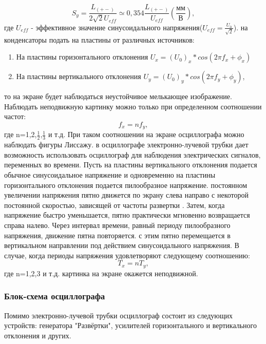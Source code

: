 \begin{equation}
\label{eq:2}
    S_{y}=\frac{L_{(+-)}}{2\sqrt{2}U_{eff} } \simeq 0,354\frac{L_{(+-)}}{U_{eff} }(\frac{\text{мм}}{\text{В}}),
\end{equation}
где $U_{eff}$ - эффективное значение синусоидального напряжения($U_{eff}=\frac{U_0}{\sqrt{2}}$).
 на конденсаторы подать на пластины от различных источников:
\begin{enumerate}
    \item На пластины горизонтального отклонения  $U_x=(U_0)_x*cos(2\pi{}f_x+\phi_x)$
   \item На пластины вертикального отклонения $U_y=(U_0)_y*cos(2\pi{}f_y+\phi_y)$,
\end{enumerate}
то на экране будет наблюдаться неустойчивое мелькающее изображение. Наблюдать неподвижную картинку можно только при определенном соотношении частот:
\begin{equation}
    f_{x}=nf_{y},
\end{equation}
 где n=1,2,$ \frac{1}{2}$,$ \frac{1}{3}$ и т.д. При таком соотношении на экране осциллографа можно наблюдать фигуры Лиссажу.
  в осциллографе электронно-лучевой трубки дает возможность
использовать осциллограф для наблюдения электрических сигналов, переменных во
времени. Пусть на пластины вертикального отклонения подается обычное синусоидальное напряжение и одновременно на пластины горизонтального отклонения подается пилообразное напряжение.
 постоянном увеличении напряжения пятно движется по экрану слева направо с некоторой постоянной скоростью, зависящей от частоты развертки . Затем, когда напряжение быстро уменьшается, пятно практически мгновенно возвращается справа налево. Через интервал времени, равный периоду пилообразного напряжения, движение пятна повторяется.
 с этим пятно перемещается в вертикальном направлении под действием синусоидального напряжения. В случае, когда периоды напряжения удовлетворяют следующему соотношению: 
\begin{equation}
    T_{x}=nT_{y},
\end{equation}
где n=1,2,3 и т.д. картинка на экране окажется неподвижной.

\subsubsection{Блок-схема осциллографа}
Помимо электронно-лучевой трубки осциллограф состоит из следующих устройств: генератора "Развёртки", усилителей горизонтального и вертикального отклонения и других.



